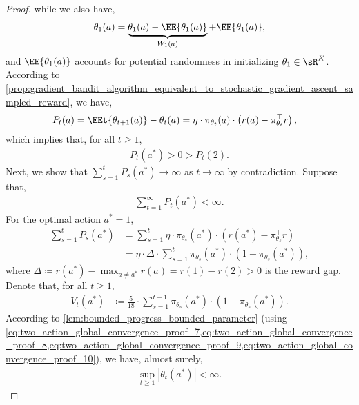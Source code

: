 \begin{proof}
while we also have,
\begin{align}
\label{eq:two_action_global_convergence_proof_5}
    \theta_1(a) = \underbrace{ \theta_{1}(a) - \EE{\theta_{1}(a)} }_{ W_1(a) } + \EE{\theta_{1}(a)},
\end{align}
and $\EE{\theta_{1}(a)}$ accounts for potential randomness in initializing $\theta_1 \in \sR^K$. According to \cref{prop:gradient_bandit_algorithm_equivalent_to_stochastic_gradient_ascent_sampled_reward}, we have,
\begin{align}
\label{eq:two_action_global_convergence_proof_6}
    P_t(a) &= \EEt{\theta_{t+1}(a)} - \theta_t(a) 
    = \eta \cdot \pi_{\theta_t}(a) \cdot \left(  r(a) - \pi_{\theta_t}^\top r \right),
\end{align}
which implies that, for all $t \ge 1$,
\begin{align}
\label{eq:two_action_global_convergence_proof_7}
    P_t(a^*) > 0 > P_t(2).
\end{align}
Next, we show that $\sum_{s=1}^t P_s(a^*) \to \infty$ as $t \to \infty$ by contradiction. Suppose that,
\begin{align}
\label{eq:two_action_global_convergence_proof_8}
    \sum_{t=1}^{\infty} P_t(a^*) < \infty.
\end{align}
For the optimal action $a^* = 1$,
\begin{align}
\label{eq:two_action_global_convergence_proof_9}
    \sum_{s=1}^t P_s(a^*) &=  \sum_{s=1}^t \eta \cdot \pi_{\theta_s}(a^*) \cdot ( r(a^*) - \pi_{\theta_s}^\top r ) \\
    &= \eta \cdot \Delta \cdot  \sum_{s=1}^t  \pi_{\theta_s}(a^*) \cdot ( 1 - \pi_{\theta_s}(a^*)  ),
\end{align}
where $\Delta \coloneqq r(a^*) - \max_{a \not= a^*}{ r(a) } = r(1) - r(2) > 0$ is the reward gap. Denote that, for all $t 
\ge 1$, 
\begin{align} 
\label{eq:two_action_global_convergence_proof_10}
    V_t(a^*) &\coloneqq \frac{5}{18} \cdot \sum_{s=1}^{t-1}  \pi_{\theta_s}(a^*) \cdot (1-\pi_{\theta_s}(a^*)).
\end{align}
According to \cref{lem:bounded_progress_bounded_parameter} (using \cref{eq:two_action_global_convergence_proof_7,eq:two_action_global_convergence_proof_8,eq:two_action_global_convergence_proof_9,eq:two_action_global_convergence_proof_10}), we have, almost surely,
\begin{align}
\label{eq:two_action_global_convergence_proof_11}
    \sup_{t \ge 1}{ |\theta_t(a^*)| } < \infty.
\end{align}

\end{proof}
